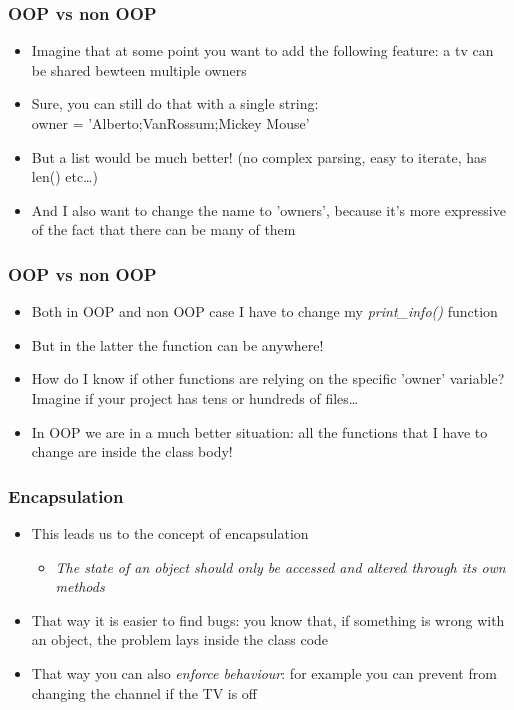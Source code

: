 \documentclass[9pt]{beamer}
\begin{document}
\begin{frame}
  \frametitle{OOP vs non OOP}
  
  \begin{itemize}
    \item Imagine that at some point you want to add the following feature: 
          a tv can be shared bewteen multiple owners
    \bigskip
    \item Sure, you can still do that with a single string: \\owner = 'Alberto;VanRossum;Mickey Mouse'
    \bigskip
    \item But a list would be much better! (no complex parsing, easy to iterate, has len() etc\dots)
    \bigskip
    \item And I also want to change the name to 'owners', because it's more expressive of the fact that there can be many of them
  \end{itemize}

\end{frame}


\begin{frame}
  \frametitle{OOP vs non OOP}
  
  \begin{itemize}
    \item Both in OOP and non OOP case I have to change my \emph{print\_info()} function 
    \bigskip
    \item But in the latter the function can be anywhere!
    \bigskip
    \item How do I know if other functions are relying on the specific 'owner' variable? Imagine if your project has tens or hundreds of files\dots
    \bigskip
    \item In OOP we are in a much better situation: all the functions that I have to change are inside the class body!
  \end{itemize}

\end{frame}


\begin{frame}
  \frametitle{Encapsulation}
  
  \begin{itemize}
    \item This leads us to the concept of \alert{encapsulation} 
    \bigskip
    \begin{itemize}
      \item \emph{The state of an object should only be accessed and altered through its own methods}
    \end{itemize}
    \bigskip
    \item That way it is easier to find bugs: you know that, if something is wrong
          with an object, the problem lays inside the class code
    \bigskip
    \item That way you can also \emph{enforce behaviour}: for example you can
          prevent from changing the channel if the TV is off
    
  \end{itemize}

\end{frame}
\end{document}
